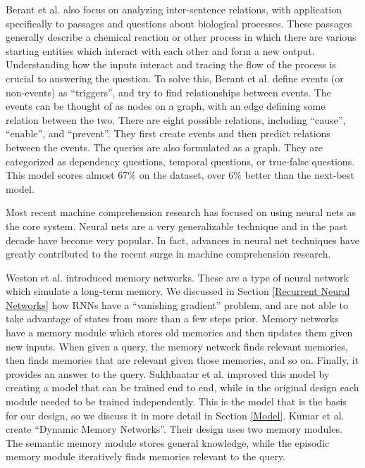 \documentclass[pageno]{final_paper}
\begin{document}
Berant et al. \cite{Berant2014} also focus on analyzing inter-sentence
relations, with application specifically to passages and questions about
biological processes. These passages generally describe a chemical reaction or
other process in which there are various starting entities which interact with
each other and form a new output. Understanding how the inputs interact and
tracing the flow of the process is crucial to answering the question. To solve
this, Berant et al. define events (or non-events) as ``triggers'', and try to
find relationships between events. The events can be thought of as nodes on a
graph, with an edge defining some relation between the two. There are eight
possible relations, including ``cause'', ``enable'', and ``prevent''. They first
create events and then predict relations between the events. The queries are
also formulated as a graph. They are categorized as dependency questions,
temporal questions, or true-false questions. This model scores almost 67\% on
the dataset, over 6\% better than the next-best model.

Most recent machine comprehension research has focused on using neural nets as
the core system. Neural nets are a very generalizable technique and in the past
decade have become very popular. In fact, advances in neural net techniques have
greatly contributed to the recent surge in machine comprehension research.

Weston et al. \cite{Weston2015a} introduced memory networks. These are a type of
neural network which simulate a long-term memory. We discussed in Section
\ref{Recurrent Neural Networks} how RNNs have a ``vanishing gradient'' problem,
and are not able to take advantage of states from more than a few steps prior.
Memory networks have a memory module which stores old memories and then updates
them given new inputs. When given a query, the memory network finds relevant
memories, then finds memories that are relevant given those memories, and so on.
Finally, it provides an answer to the query. Sukhbaatar et al.
\cite{Sukhbaatar2015} improved this model by creating a model that can be
trained end to end, while in the original design each module needed to be
trained independently. This is the model that is the basis for our design, so we
discuss it in more detail in Section \ref{Model}. Kumar et al. \cite{Kumar2015}
create ``Dynamic Memory Networks''. Their design uses two memory modules. The
semantic memory module stores general knowledge, while the episodic memory
module iteratively finds memories relevant to the query.
\end{document}
